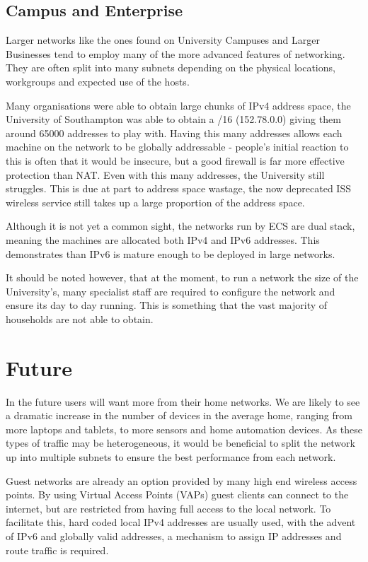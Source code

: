 \documentclass[12pt]{report}
\begin{document}
\subsection{Campus and Enterprise}
Larger networks like the ones found on University Campuses and Larger
Businesses tend to employ many of the more advanced features of networking.
They are often split into many subnets depending on the physical locations,
workgroups and expected use of the hosts. 

Many organisations were able to obtain large chunks of IPv4 address space, the
University of Southampton was able to obtain a /16 (152.78.0.0) giving them
around 65000 addresses to play with. Having this many addresses allows each
machine on the network to be globally addressable - people's initial reaction
to this is often that it would be insecure, but a good firewall is far more effective
protection than NAT. Even with this many addresses, the University still
struggles. This is due at part to address space wastage, the now deprecated ISS
wireless service still takes up a large proportion of the address space. 

Although it is not yet a common sight, the networks run by ECS are dual stack,
meaning the machines are allocated both IPv4 and IPv6 addresses. This
demonstrates than IPv6 is mature enough to be deployed in large networks.

It should be noted however, that at the moment, to run a network the size of
the University's, many specialist staff are required to configure the network
and ensure its day to day running. This is something that the vast majority of
households are not able to obtain.

\section{Future}
In the future users will want more from their home networks. We are likely to
see a dramatic increase in the number of devices in the average home, ranging
from more laptops and tablets, to more sensors and home automation devices.
As these types of traffic may be heterogeneous, it would be beneficial to split
the network up into multiple subnets to ensure the best performance from each
network. 

Guest networks are already an option provided by many high end wireless access
points. By using Virtual Access Points (VAPs) guest clients can connect to the
internet, but are restricted from having full access to the local network. To
facilitate this, hard coded local IPv4 addresses are usually used, with the
advent of IPv6 and globally valid addresses, a mechanism to assign IP addresses
and route traffic is required.  
\end{document}
